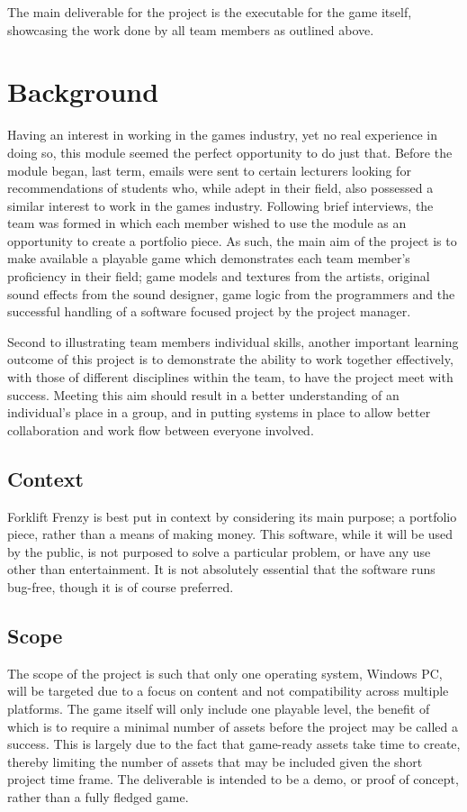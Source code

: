 \documentclass[12pt]{article}
\begin{document}
	The main deliverable for the project is the executable for the game itself, showcasing the work done by all team members as outlined above.

\section{Background}
Having an interest in working in the games industry, yet no real experience in doing so, this module seemed the perfect opportunity to do just that. Before the module began, last term, emails were sent to certain lecturers looking for recommendations of students who, while adept in their field, also possessed a similar interest to work in the games industry. Following brief interviews, the team was formed in which each member wished to use the module as an opportunity to create a portfolio piece. As such, the main aim of the project is to make available a playable game which demonstrates each team member’s proficiency in their field; game models and textures from the artists, original sound effects from the sound designer, game logic from the programmers and the successful handling of a software focused project by the project manager. 

Second to illustrating team members individual skills, another important learning outcome of this project is to demonstrate the ability to work together effectively, with those of different disciplines within the team, to have the project meet with success. Meeting this aim should result in a better understanding of an individual’s place in a group, and in putting systems in place to allow better collaboration and work flow between everyone involved.


\subsection{Context}
Forklift Frenzy is best put in context by considering its main purpose; a portfolio piece, rather than a means of making money. This software, while it will be used by the public, is not purposed to solve a particular problem, or have any use other than entertainment. It is not absolutely essential that the software runs bug-free, though it is of course preferred.


\subsection{Scope}
The scope of the project is such that only one operating system, Windows PC, will be targeted due to a focus on content and not compatibility across multiple platforms. The game itself will only include one playable level, the benefit of which is to require a minimal number of assets before the project may be called a success. This is largely due to the fact that game-ready assets take time to create, thereby limiting the number of assets that may be included given the short project time frame. The deliverable is intended to be a demo, or proof of concept, rather than a fully fledged game. 
\end{document}

